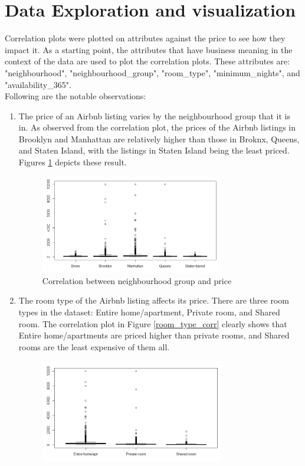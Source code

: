 \documentclass{sig-alternate}
\begin{document}
	\section{Data Exploration and visualization}
	Correlation plots were plotted on attributes against the price to see how they impact it. As a starting point, the attributes that have business meaning in the context of the data are used to plot the correlation plots. These attributes are: "neighbourhood", "neighbourhood\_group", "room\_type", "minimum\_nights", and "availability\_365".\\
	Following are the notable observations:
	\begin{enumerate}
		\item The price of an Airbnb listing varies by the neighbourhood group that it is in. As observed from the correlation plot, the prices of the Airbnb listings in Brooklyn and Manhattan are relatively higher than those in Broknx, Queens, and Staten Island, with the listings in Staten Island being the least priced.
		Figures \ref{neighborhood_grp_corr} depicts these result.
		\begin{figure}[ht]
			\includegraphics[width=8cm]{neighborhood_grp_corr.png}
			\centering
			\caption{Correlation between neighbourhood group and price}
			\label{neighborhood_grp_corr}
		\end{figure}
		\item The room type of the Airbnb listing affects its price. There are three room types in the dataset: Entire home/apartment, Private room, and Shared room. The correlation plot in Figure \ref{room_type_corr} clearly shows that Entire home/apartments are priced higher than private rooms, and Shared rooms are the least expensive of them all.
		\begin{figure}[ht]
			\includegraphics[width=8cm]{room_type_corr.png}

\end{figure}
\end{enumerate}
\end{document}
